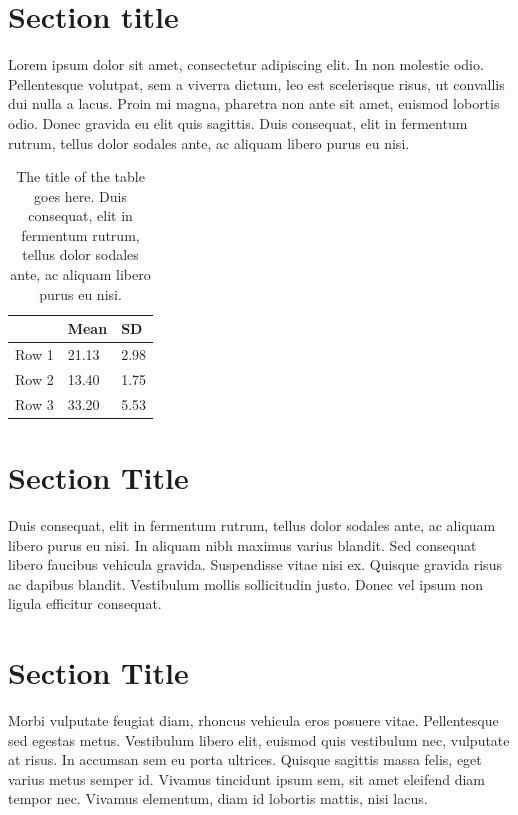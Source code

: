 \documentclass[12pt]{report}
\begin{document}
\section{Section title}
Lorem ipsum dolor sit amet, consectetur adipiscing elit. In non molestie odio. Pellentesque volutpat, sem a viverra dictum, leo est scelerisque risus, ut convallis dui nulla a lacus. Proin mi magna, pharetra non ante sit amet, euismod lobortis odio. Donec gravida eu elit quis sagittis. Duis consequat, elit in fermentum rutrum, tellus dolor sodales ante, ac aliquam libero purus eu nisi. 

\begin{table}[H]
\caption[The title of the table goes here. This is a very long title that wraps over onto the next line.]{The title of the table goes here. Duis consequat, elit in fermentum rutrum, tellus dolor sodales ante, ac aliquam libero purus eu nisi.}
\label{tab:table_example1}
\begin{center}
\begin{tabular}{lll}
      & Mean  & SD   \\ \hline
Row 1 & 21.13 & 2.98 \\ 
Row 2 & 13.40 & 1.75 \\ 
Row 3 & 33.20 & 5.53 \\ \hline
\end{tabular}
\end{center}
\end{table}

\section{Section Title}
Duis consequat, elit in fermentum rutrum, tellus dolor sodales ante, ac aliquam libero purus eu nisi. In aliquam nibh maximus varius blandit. Sed consequat libero faucibus vehicula gravida. Suspendisse vitae nisi ex. Quisque gravida risus ac dapibus blandit. Vestibulum mollis sollicitudin justo. Donec vel ipsum non ligula efficitur consequat. 


\section{Section Title}
Morbi vulputate feugiat diam, rhoncus vehicula eros posuere vitae. Pellentesque sed egestas metus. Vestibulum libero elit, euismod quis vestibulum nec, vulputate at risus. In accumsan sem eu porta ultrices. Quisque sagittis massa felis, eget varius metus semper id. Vivamus tincidunt ipsum sem, sit amet eleifend diam tempor nec. Vivamus elementum, diam id lobortis mattis, nisi lacus.
\end{document}
